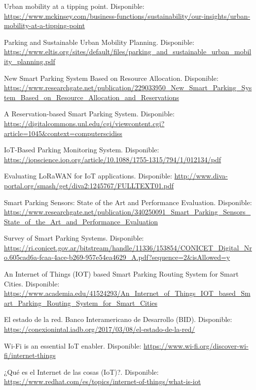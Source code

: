 \begin{references}
    Urban mobility at a tipping point. Disponible: \url{https://www.mckinsey.com/business-functions/sustainability/our-insights/urban-mobility-at-a-tipping-point}

    Parking and Sustainable Urban Mobility Planning. Disponible: 
    \url{https://www.eltis.org/sites/default/files/parking_and_sustainable_urban_mobility_planning.pdf}

    New Smart Parking System Based on Resource Allocation. Disponible: 
    \url{https://www.researchgate.net/publication/229033950_New_Smart_Parking_System_Based_on_Resource_Allocation_and_Reservations}

    A Reservation-based Smart Parking System. Disponible: 
    \url{https://digitalcommons.unl.edu/cgi/viewcontent.cgi?article=1045&context=computerscidiss}

    IoT-Based Parking Monitoring System. Disponible: 
    \url{https://iopscience.iop.org/article/10.1088/1755-1315/794/1/012134/pdf}

    Evaluating LoRaWAN for IoT applications. Disponible: 
    \url{http://www.diva-portal.org/smash/get/diva2:1245767/FULLTEXT01.pdf}

    Smart Parking Sensors: State of the Art and Performance Evaluation. Disponible: 
    \url{https://www.researchgate.net/publication/340250091_Smart_Parking_Sensors_State_of_the_Art_and_Performance_Evaluation}

    Survey of Smart Parking Systems. Disponible: 
    \url{https://ri.conicet.gov.ar/bitstream/handle/11336/153854/CONICET_Digital_Nro.605cad6a-fcaa-4ace-b269-957e54ea4629_A.pdf?sequence=2&isAllowed=y}

    An Internet of Things (IOT) based Smart Parking Routing System for Smart Cities. Disponible: 
    \url{https://www.academia.edu/41524293/An_Internet_of_Things_IOT_based_Smart_Parking_Routing_System_for_Smart_Cities}

    El estado de la red. Banco Interamericano de Desarrollo (BID). Disponible: 
    \url{https://conexionintal.iadb.org/2017/03/08/el-estado-de-la-red/}
    
    Wi-Fi is an essential IoT enabler. Disponible:
    \url{https://www.wi-fi.org/discover-wi-fi/internet-things}

    ¿Qué es el Internet de las cosas (IoT)?. Disponible:
    \url{https://www.redhat.com/es/topics/internet-of-things/what-is-iot}


\end{references}
